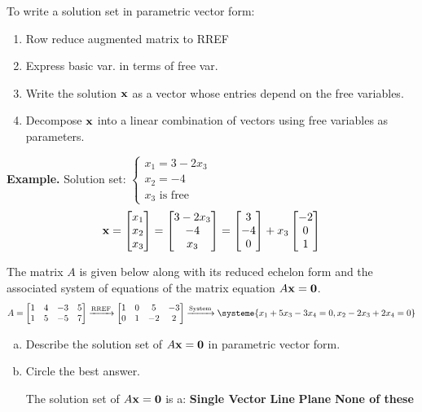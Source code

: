 \begin{boxme}
	\begin{multicols}{2}
	To write a solution set in parametric vector form:
	\begin{enumerate}[(1)]\itemsep0em 
		\item Row reduce augmented matrix to RREF
		\item Express basic var. in terms of free var.
		\item Write the solution $\boldsymbol{\mathbf{x}}$ as a vector whose entries depend on the free variables.
		\item Decompose $\boldsymbol{\mathbf{x}}$ into a linear combination of vectors using free variables as parameters.
	\end{enumerate}
	
	\columnbreak
	
	\textbf{Example.}
	Solution set: $\begin{cases}x_1=3-2x_3 \\ x_2 = -4 \\ x_3 \text{ is free}\end{cases}$
	$$\boldsymbol{\mathbf{x}}=\begin{bmatrix}x_1\\x_2\\x_3\end{bmatrix}
	=\begin{bmatrix}3-2x_3\\-4\\x_3\end{bmatrix}
	=\begin{bmatrix}3\\-4\\0\end{bmatrix} +x_3\begin{bmatrix}-2\\0\\1\end{bmatrix}$$
	\end{multicols}
\end{boxme}
\begin{exercise} %
	The matrix $A$ is given below along with its reduced echelon form and the associated system of equations of the matrix equation $A\boldsymbol{\mathbf{x}}=\boldsymbol{\mathbf{0}}$.
	$$A=\begin{bmatrix}1&4&-3&5\\1&5&-5&7\end{bmatrix}\xrightarrow{\text{RREF}}
	\begin{bmatrix}1&0&5&-3\\0&1&-2&2\end{bmatrix}\xrightarrow{\text{System}}
	\systeme{x_1 + 5x_3 - 3x_4 = 0, x_2 - 2x_3 + 2x_4 = 0} $$
	\begin{enumerate}[(a)]
		\item Describe the solution set of $A\boldsymbol{\mathbf{x}}=\boldsymbol{\mathbf{0}}$ in parametric vector form.
		\vfill
		\item Circle the best answer. \par
		The solution set of $A\boldsymbol{\mathbf{x}}=\boldsymbol{\mathbf{0}}$ is a: \quad \textbf{Single Vector} \qquad \textbf{Line} \qquad \textbf{Plane} \qquad \textbf{None of these}
	\end{enumerate}
\end{exercise}


